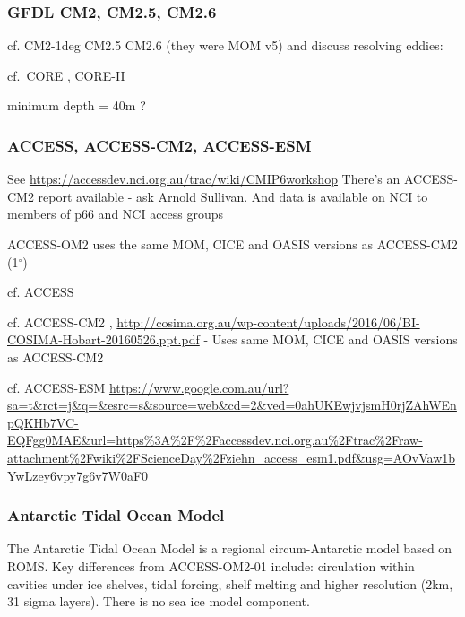 \documentclass[11pt]{article}
\begin{document}
\subsubsection{GFDL CM2, CM2.5, CM2.6}
cf. CM2-1deg CM2.5 CM2.6 (they were MOM v5) and discuss resolving eddies: \citet{GriffiesWintonAndersonBensonDelworthDufourDunneGoddardMorrison2015a}
\citet{DelworthRosatiAndersonAdcroftBalajiBensonDixonGriffiesLee2012a}
\citet{DunneJohnAdcroftGriffiesHallbergShevliakovaStoufferCookeDunne2012a}
\citet{Griffies2015a}

cf.\ CORE \citep{GriffiesBiastochBoningBryanDanabasogluChassignetEnglandGerdesHaak2009a}, CORE-II \citep{DanabasogluYeagerBaileyBehrensBentsenBiBiastochBoningBozec2014a}

minimum depth = 40m ?

\subsubsection{ACCESS, ACCESS-CM2, ACCESS-ESM}
See \url{https://accessdev.nci.org.au/trac/wiki/CMIP6workshop}
There's an ACCESS-CM2 report available - ask Arnold Sullivan.
And data is available on NCI to members of p66 and NCI access groups

ACCESS-OM2 uses the same MOM, CICE and OASIS versions as ACCESS-CM2 (1$^\circ$)

cf. ACCESS \citet{BiDixMarslandOFarrellRashidUotilaHirstKowalczykGolebiewski2013a, BiMarslandUotilaOFarrellFiedlerSullivanGriffiesZhouHirst2013a, DixVohralikBiRashidMarslandOFarrellUotilaHirstKowalczyk2013a}

\citet{BiMarslandUotilaOFarrellFiedlerSullivanGriffiesZhouHirst2013a}

cf. ACCESS-CM2 \citet{BiYanSullivan2016a}, \url{http://cosima.org.au/wp-content/uploads/2016/06/BI-COSIMA-Hobart-20160526.ppt.pdf} - Uses same MOM, CICE and OASIS versions as ACCESS-CM2

cf. ACCESS-ESM \url{https://www.google.com.au/url?sa=t&rct=j&q=&esrc=s&source=web&cd=2&ved=0ahUKEwjvjsmH0rjZAhWEnpQKHb7VC-EQFgg0MAE&url=https%3A%2F%2Faccessdev.nci.org.au%2Ftrac%2Fraw-attachment%2Fwiki%2FScienceDay%2Fziehn_access_esm1.pdf&usg=AOvVaw1bYwLzey6vpy7g6v7W0aF0}

\subsubsection{Antarctic Tidal Ocean Model}
The Antarctic Tidal Ocean Model is a regional circum-Antarctic model based on ROMS. Key differences from ACCESS-OM2-01 include: circulation within cavities under ice shelves, tidal forcing, shelf melting and  higher resolution (2km, 31 sigma layers). There is no sea ice model component.
\end{document}
